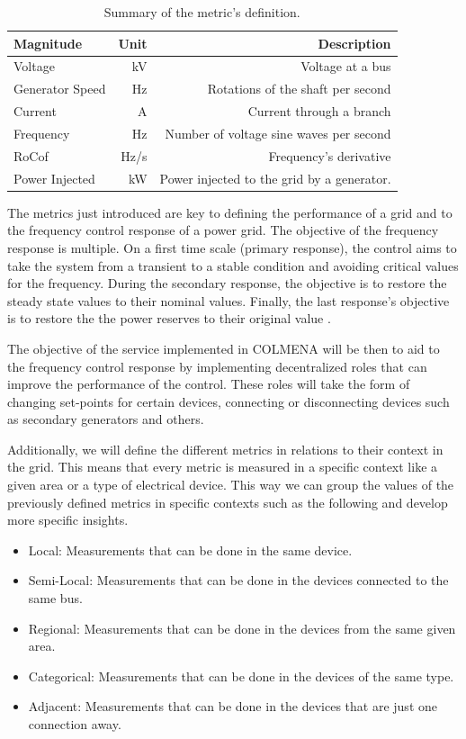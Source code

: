 \documentclass{article}
\begin{document}
\begin{table}[H]
    \centering
    \caption{Summary of the metric's definition.}
    \begin{tabular}{lrr}
        \hline
        \textbf{Magnitude} & \textbf{Unit} & \textbf{Description} \\
        \hline
        \hline
        Voltage & kV & Voltage at a bus \\
        Generator Speed & Hz & Rotations of the shaft per second\\
        Current & A & Current through a branch \\
        Frequency & Hz & Number of voltage sine waves per second\\
        RoCof & Hz/s & Frequency's derivative \\
        Power Injected & kW & Power injected to the grid by a generator. \\
    \hline
    \end{tabular}
\end{table}
  

The metrics just introduced are key to defining the performance of a grid and to the frequency control response of a power grid. The objective of the frequency response is multiple. On a first time scale (primary response)\cite{source:NRELfrequency}, the control aims to take the system from a transient to a stable condition and avoiding critical values for the frequency. During the secondary response, the objective is to restore the steady state values to their nominal values. Finally, the last response's objective is to restore the the power reserves to their original value \cite{source:bookelectron}.

The objective of the service implemented in COLMENA will be then to aid to the frequency control response by implementing decentralized roles that can improve the performance of the control. These roles will take the form of changing set-points for certain devices, connecting or disconnecting devices such as secondary generators and others. 

Additionally, we will define the different metrics in relations to their context in the grid. This means that every metric is measured in a specific context like a given area or a type of electrical device. This way we can group the values of the previously defined metrics in specific contexts such as the following and develop more specific insights.

\begin{itemize}
\item Local: Measurements that can be done in the same device. 
\item Semi-Local: Measurements that can be done in the devices connected to the same bus. 
\item Regional: Measurements that can be done in the devices from the same given area. 
\item Categorical: Measurements that can be done in the devices of the same type. 
\item Adjacent: Measurements that can be done in the devices that are just one connection away.
\end{itemize}
\end{document}
